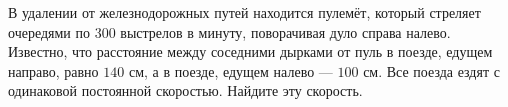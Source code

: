 В удалении от железнодорожных путей находится пулемёт, который стреляет очередями по $300$ выстрелов в минуту, поворачивая дуло справа налево. Известно, что расстояние между соседними дырками от пуль в поезде, едущем направо, равно $140$ см, а в поезде, едущем налево --- $100$ см. Все поезда ездят с одинаковой постоянной скоростью. Найдите эту скорость.